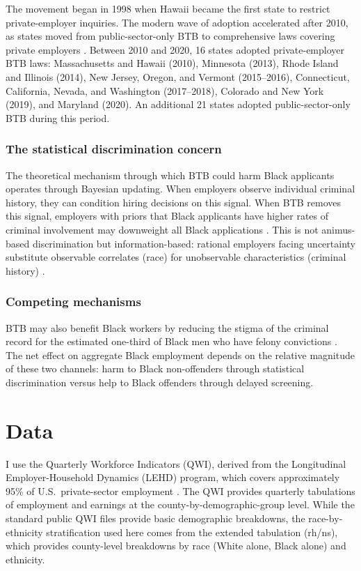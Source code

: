 \documentclass[12pt]{article}
\begin{document}
The movement began in 1998 when Hawaii became the first state to restrict private-employer inquiries. The modern wave of adoption accelerated after 2010, as states moved from public-sector-only BTB to comprehensive laws covering private employers \citep{doleac2020}. Between 2010 and 2020, 16 states adopted private-employer BTB laws: Massachusetts and Hawaii (2010), Minnesota (2013), Rhode Island and Illinois (2014), New Jersey, Oregon, and Vermont (2015--2016), Connecticut, California, Nevada, and Washington (2017--2018), Colorado and New York (2019), and Maryland (2020). An additional 21 states adopted public-sector-only BTB during this period.

\subsubsection*{The statistical discrimination concern} The theoretical mechanism through which BTB could harm Black applicants operates through Bayesian updating. When employers observe individual criminal history, they can condition hiring decisions on this signal. When BTB removes this signal, employers with priors that Black applicants have higher rates of criminal involvement may downweight all Black applications \citep{phelps1972, arrow1973}. This is not animus-based discrimination but information-based: rational employers facing uncertainty substitute observable correlates (race) for unobservable characteristics (criminal history) \citep{aigner1977}.

\subsubsection*{Competing mechanisms} BTB may also benefit Black workers by reducing the stigma of the criminal record for the estimated one-third of Black men who have felony convictions \citep{shannon2017}. The net effect on aggregate Black employment depends on the relative magnitude of these two channels: harm to Black non-offenders through statistical discrimination versus help to Black offenders through delayed screening.


\section{Data}

I use the Quarterly Workforce Indicators (QWI), derived from the Longitudinal Employer-Household Dynamics (LEHD) program, which covers approximately 95\% of U.S.\ private-sector employment \citep{abowd2009}. The QWI provides quarterly tabulations of employment and earnings at the county-by-demographic-group level. While the standard public QWI files provide basic demographic breakdowns, the race-by-ethnicity stratification used here comes from the extended tabulation (rh/ns), which provides county-level breakdowns by race (White alone, Black alone) and ethnicity.
\end{document}
